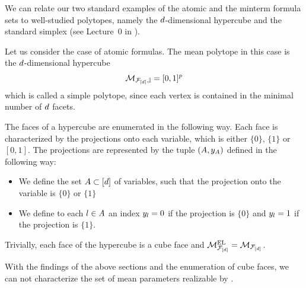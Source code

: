 
We can relate our two standard examples of the atomic and the minterm formula sets to well-studied polytopes, namely the $d$-dimensional hypercube and the standard simplex (see Lecture~0 in \cite{ziegler_lectures_2013}).

\begin{example}
    \label{exa:atomicFormulasHypercube}
    Let us consider the case of atomic formulas. %
    The mean polytope in this case is the $d$-dimensional hypercube
    \begin{align*}
        \mathcal{M}_{\mathcal{F}_{[d]},\mathbb{I}} = [0,1]^{p}
    \end{align*}
    which is called a simple polytope, since each vertex is contained in the minimal number of $d$ facets.

    The faces of a hypercube are enumerated in the following way.
    Each face is characterized by the projections onto each variable, which is either $\{0\}$, $\{1\}$ or $[0,1]$.
    The projections are represented by the tuple $(A,y_{A})$ defined in the following way:
    \begin{itemize}
        \item We define the set $A\subset[d]$ of variables, such that the projection onto the variable is $\{0\}$ or $\{1\}$
        \item We define to each $l\in A$ an index $y_{l}=0$ if the projection is $\{0\}$ and $y_{l}=1$ if the projection is $\{1\}$.
    \end{itemize}


    Trivially, each face of the hypercube is a cube face and $\mathcal{M}^{\mathrm{EL}}_{\mathcal{F}_{[d]}}=\mathcal{M}_{\mathcal{F}_{[d]}}$.
\end{example}


With the findings of the above sections and the enumeration of cube faces, we can not characterize the set of mean parameters realizable by \HybridLogicNetworks{}.

